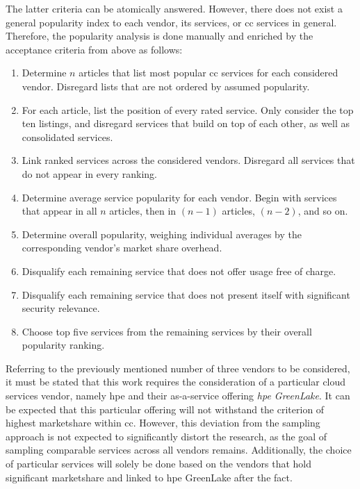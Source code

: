 The latter criteria can be atomically answered. However, there does not exist a general popularity index to each vendor, its services, or \ac{cc} services in general. Therefore, the popularity analysis is done manually and enriched by the acceptance criteria from above as follows:

\begin{enumerate}
	\item Determine $n$ articles that list most popular \ac{cc} services for each considered vendor. Disregard lists that are not ordered by assumed popularity.
	\item For each article, list the position of every rated service. Only consider the top ten listings, and disregard services that build on top of each other, as well as consolidated services.
	\item Link ranked services across the considered vendors. Disregard all services that do not appear in every ranking.
	\item Determine average service popularity for each vendor. Begin with services that appear in all $n$ articles, then in $(n-1)$ articles, $(n-2)$, and so on.
	\item Determine overall popularity, weighing individual averages by the corresponding vendor's market share overhead.
	\item Disqualify each remaining service that does not offer usage free of charge.
	\item Disqualify each remaining service that does not present itself with significant security relevance.
	\item Choose top five services from the remaining services by their overall popularity ranking.
\end{enumerate}

Referring to the previously mentioned number of three vendors to be considered, it must be stated that this work requires the consideration of a particular cloud services vendor, namely \acf{hpe} and their as-a-service offering \textit{\acs{hpe} GreenLake}. It can be expected that this particular offering will not withstand the criterion of highest marketshare within \ac{cc}. However, this deviation from the sampling approach is not expected to significantly distort the research, as the goal of sampling comparable services across all vendors remains. Additionally, the choice of particular services will solely be done based on the vendors that hold significant marketshare and linked to \acs{hpe} GreenLake after the fact.

